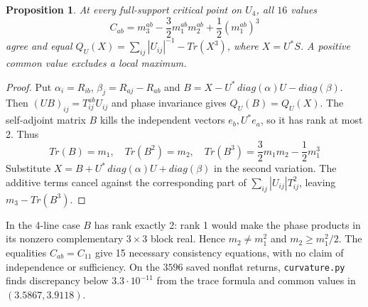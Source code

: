 \documentclass[11pt,a4paper]{article}
\newtheorem{prop}[thm]{Proposition}
\begin{document}
\begin{prop}\label{realcubic}
At every full-support critical point on $U_4$, all $16$ values
\[
 C_{ab}=m_3^{ab}-\frac32m_1^{ab}m_2^{ab}
              +\frac12(m_1^{ab})^3
\]
agree and equal $Q_U(X)=\sum_{ij}|U_{ij}|^{-1}-Tr(X^3)$, where
$X=U^*S$. A positive common value excludes a local maximum.
\end{prop}
\begin{proof}
Put $\alpha_i=R_{ib}$, $\beta_j=R_{aj}-R_{ab}$ and
$B=X-U^*\,diag(\alpha)U-diag(\beta)$. Then
$(UB)_{ij}=T^{ab}_{ij}U_{ij}$ and phase invariance gives $Q_U(B)=Q_U(X)$.
The self-adjoint matrix $B$ kills the independent vectors $e_b,U^*e_a$,
so it has rank at most 2. Thus
\[
 Tr(B)=m_1,\quad Tr(B^2)=m_2,\quad
 Tr(B^3)=\frac32m_1m_2-\frac12m_1^3
\]
Substitute $X=B+U^*\,diag(\alpha)U+diag(\beta)$ in the second variation.
The additive terms cancel against the corresponding part of
$\sum_{ij}|U_{ij}|T_{ij}^2$, leaving $m_3-Tr(B^3)$.
\end{proof}
In the 4-line case $B$ has rank exactly 2: rank 1 would make
the phase products in its nonzero complementary $3\times3$ block
real. Hence $m_2\ne m_1^2$ and $m_2\ge m_1^2/2$. The equalities
$C_{ab}=C_{11}$ give 15 necessary consistency equations, with no
claim of independence or sufficiency. On the $3596$ saved nonflat returns,
\texttt{curvature.py} finds discrepancy below $3.3\cdot10^{-11}$ from
the trace formula and common values in $(3.5867,3.9118)$.
\end{document}

